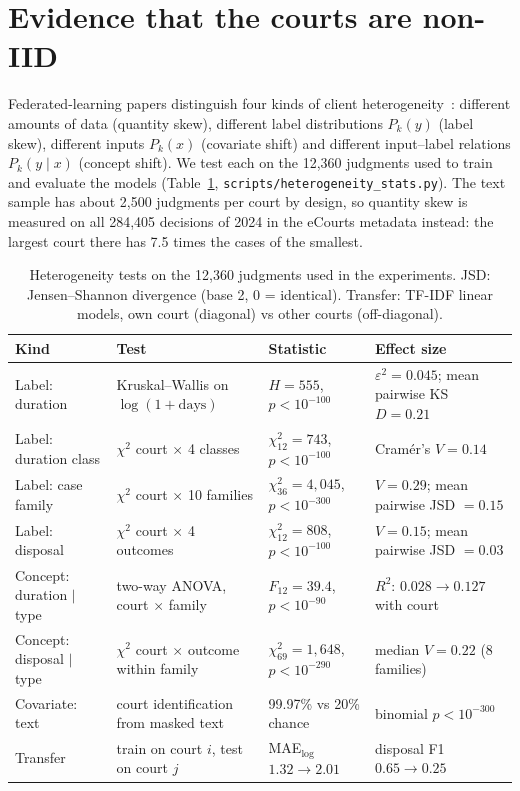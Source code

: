 \section{Evidence that the courts are non-IID}
\label{sec:hetero}
Federated-learning papers distinguish four kinds of client heterogeneity~\cite{kairouz2021advances}:
different amounts of data (quantity skew), different label distributions $P_k(y)$ (label skew),
different inputs $P_k(x)$ (covariate shift) and different input--label relations $P_k(y\mid x)$
(concept shift). We test each on the 12,360 judgments used to train and evaluate the models
(Table~\ref{tab:hetero}, \texttt{scripts/heterogeneity\_stats.py}). The text sample has about 2,500
judgments per court by design, so quantity skew is measured on all 284,405 decisions of 2024 in the
eCourts metadata instead: the largest court there has 7.5 times the cases of the smallest.

\begin{table}[h]\centering\small
\begin{tabular}{@{}llll@{}}\toprule
Kind & Test & Statistic & Effect size \\ \midrule
Label: duration & Kruskal--Wallis on $\log(1+\text{days})$ & $H=555$, $p<10^{-100}$ & $\varepsilon^2=0.045$; mean pairwise KS $D=0.21$ \\
Label: duration class & $\chi^2$ court $\times$ 4 classes & $\chi^2_{12}=743$, $p<10^{-100}$ & Cram\'er's $V=0.14$ \\
Label: case family & $\chi^2$ court $\times$ 10 families & $\chi^2_{36}=4{,}045$, $p<10^{-300}$ & $V=0.29$; mean pairwise JSD $=0.15$ \\
Label: disposal & $\chi^2$ court $\times$ 4 outcomes & $\chi^2_{12}=808$, $p<10^{-100}$ & $V=0.15$; mean pairwise JSD $=0.03$ \\
Concept: duration $\mid$ type & two-way ANOVA, court $\times$ family & $F_{12}=39.4$, $p<10^{-90}$ & $R^2$: $0.028\rightarrow0.127$ with court \\
Concept: disposal $\mid$ type & $\chi^2$ court $\times$ outcome within family & $\chi^2_{69}=1{,}648$, $p<10^{-290}$ & median $V=0.22$ (8 families) \\
Covariate: text & court identification from masked text & 99.97\% vs 20\% chance & binomial $p<10^{-300}$ \\
Transfer & train on court $i$, test on court $j$ & MAE$_{\log}$ $1.32\rightarrow2.01$ & disposal F1 $0.65\rightarrow0.25$ \\ \bottomrule
\end{tabular}
\caption{Heterogeneity tests on the 12,360 judgments used in the experiments. JSD: Jensen--Shannon divergence
(base 2, 0 = identical). Transfer: TF-IDF linear models, own court (diagonal) vs other courts (off-diagonal).}
\label{tab:hetero}
\end{table}


